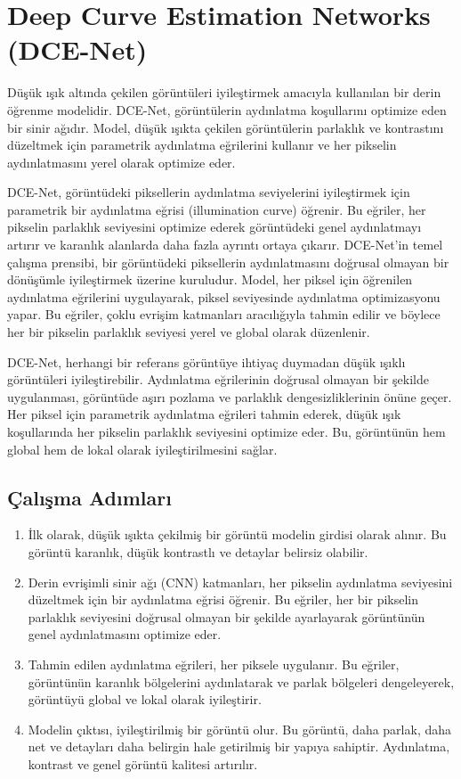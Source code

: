 \section{Deep Curve Estimation Networks (DCE-Net)}

Düşük ışık altında çekilen görüntüleri iyileştirmek amacıyla kullanılan bir derin öğrenme modelidir. DCE-Net, görüntülerin aydınlatma koşullarını optimize eden bir sinir ağıdır. Model, düşük ışıkta çekilen görüntülerin parlaklık ve kontrastını düzeltmek için parametrik aydınlatma eğrilerini kullanır ve her pikselin aydınlatmasını yerel olarak optimize eder.

DCE-Net, görüntüdeki piksellerin aydınlatma seviyelerini iyileştirmek için parametrik bir aydınlatma eğrisi (illumination curve) öğrenir. Bu eğriler, her pikselin parlaklık seviyesini optimize ederek görüntüdeki genel aydınlatmayı artırır ve karanlık alanlarda daha fazla ayrıntı ortaya çıkarır. DCE-Net’in temel çalışma prensibi, bir görüntüdeki piksellerin aydınlatmasını doğrusal olmayan bir dönüşümle iyileştirmek üzerine kuruludur. Model, her piksel için öğrenilen aydınlatma eğrilerini uygulayarak, piksel seviyesinde aydınlatma optimizasyonu yapar. Bu eğriler, çoklu evrişim katmanları aracılığıyla tahmin edilir ve böylece her bir pikselin parlaklık seviyesi yerel ve global olarak düzenlenir.

DCE-Net, herhangi bir referans görüntüye ihtiyaç duymadan düşük ışıklı görüntüleri iyileştirebilir. Aydınlatma eğrilerinin doğrusal olmayan bir şekilde uygulanması, görüntüde aşırı pozlama ve parlaklık dengesizliklerinin önüne geçer. Her piksel için parametrik aydınlatma eğrileri tahmin ederek, düşük ışık koşullarında her pikselin parlaklık seviyesini optimize eder. Bu, görüntünün hem global hem de lokal olarak iyileştirilmesini sağlar.

\subsection{Çalışma Adımları}

\begin{enumerate}
    \item İlk olarak, düşük ışıkta çekilmiş bir görüntü modelin girdisi olarak alınır. Bu görüntü karanlık, düşük kontrastlı ve detaylar belirsiz olabilir.
    \item Derin evrişimli sinir ağı (CNN) katmanları, her pikselin aydınlatma seviyesini düzeltmek için bir aydınlatma eğrisi öğrenir. Bu eğriler, her bir pikselin parlaklık seviyesini doğrusal olmayan bir şekilde ayarlayarak görüntünün genel aydınlatmasını optimize eder.
    \item Tahmin edilen aydınlatma eğrileri, her piksele uygulanır. Bu eğriler, görüntünün karanlık bölgelerini aydınlatarak ve parlak bölgeleri dengeleyerek, görüntüyü global ve lokal olarak iyileştirir.
    \item Modelin çıktısı, iyileştirilmiş bir görüntü olur. Bu görüntü, daha parlak, daha net ve detayları daha belirgin hale getirilmiş bir yapıya sahiptir. Aydınlatma, kontrast ve genel görüntü kalitesi artırılır.
\end{enumerate}

\newpage